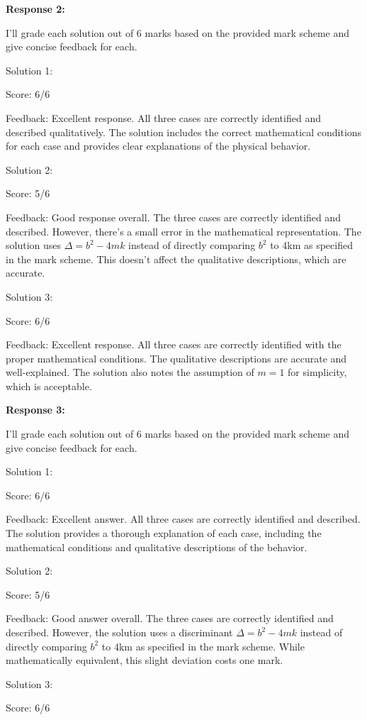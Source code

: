 \documentclass[a4paper,11pt]{article}
\begin{document}
\bigskip
\textbf{Response 2:}

I'll grade each solution out of 6 marks based on the provided mark scheme and give concise feedback for each.

Solution 1:

Score: 6/6

Feedback: Excellent response. All three cases are correctly identified and described qualitatively. The solution includes the correct mathematical conditions for each case and provides clear explanations of the physical behavior.

Solution 2:

Score: 5/6

Feedback: Good response overall. The three cases are correctly identified and described. However, there's a small error in the mathematical representation. The solution uses \(\Delta = b^2 - 4mk\) instead of directly comparing \(b^2\) to 4km as specified in the mark scheme. This doesn't affect the qualitative descriptions, which are accurate.

Solution 3:

Score: 6/6

Feedback: Excellent response. All three cases are correctly identified with the proper mathematical conditions. The qualitative descriptions are accurate and well-explained. The solution also notes the assumption of \(m=1\) for simplicity, which is acceptable.

\bigskip
\textbf{Response 3:}

I'll grade each solution out of 6 marks based on the provided mark scheme and give concise feedback for each.

Solution 1:

Score: 6/6

Feedback: Excellent answer. All three cases are correctly identified and described. The solution provides a thorough explanation of each case, including the mathematical conditions and qualitative descriptions of the behavior.

Solution 2:

Score: 5/6

Feedback: Good answer overall. The three cases are correctly identified and described. However, the solution uses a discriminant \( \Delta = b^2 - 4mk \) instead of directly comparing \(b^2\) to 4km as specified in the mark scheme. While mathematically equivalent, this slight deviation costs one mark.

Solution 3:

Score: 6/6
\end{document}
